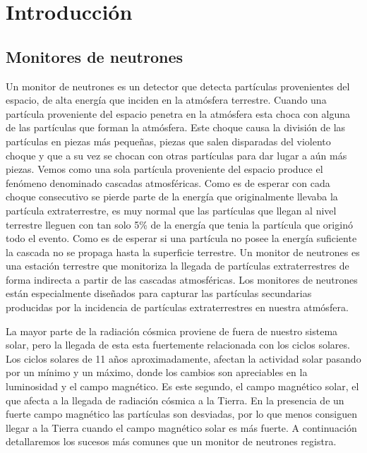 \chapter{Introducción}
\label{cap1}

\section{Monitores de neutrones}
	Un monitor de neutrones es un detector que detecta partículas provenientes del espacio, de alta energía que inciden en la atmósfera terrestre. 
	Cuando una partícula proveniente del espacio penetra en la atmósfera esta choca con alguna de las partículas que forman la atmósfera. 
	Este choque causa la división de las partículas en piezas más pequeñas, piezas que salen disparadas del violento choque y que a su vez 
	se chocan con otras partículas para dar lugar a aún más piezas. Vemos como una sola partícula proveniente del espacio produce el fenómeno 
	denominado cascadas atmosféricas. Como es de esperar con cada choque consecutivo se pierde parte de la energía que originalmente llevaba la 
	partícula extraterrestre, es muy normal que las partículas que llegan al nivel terrestre lleguen con tan solo 5\% de la energía que tenia la 
	partícula que originó todo el evento. Como es de esperar si una partícula no posee la energía suficiente la cascada no se propaga hasta la 
	superficie terrestre. Un monitor de neutrones es una estación terrestre que monitoriza la llegada de partículas extraterrestres de forma 
	indirecta a partir de las cascadas atmosféricas. Los monitores de neutrones están especialmente diseñados para capturar las partículas 
	secundarias producidas por la incidencia de partículas extraterrestres en nuestra atmósfera.
	\par
	La mayor parte de la radiación cósmica proviene de fuera de nuestro sistema solar, pero la llegada de esta esta fuertemente relacionada con 
	los ciclos solares. Los ciclos solares de 11 años aproximadamente, afectan la actividad solar pasando por un mínimo y un máximo, donde los
	cambios son apreciables en la luminosidad y el campo magnético. Es este segundo, el campo magnético solar, el que afecta a la llegada de 
	radiación cósmica a la Tierra. En la presencia de un fuerte campo magnético las partículas son desviadas, por lo que menos consiguen llegar a
	la Tierra cuando el campo magnético solar es más fuerte. A continuación detallaremos los sucesos más comunes que un monitor de neutrones
	registra. 
